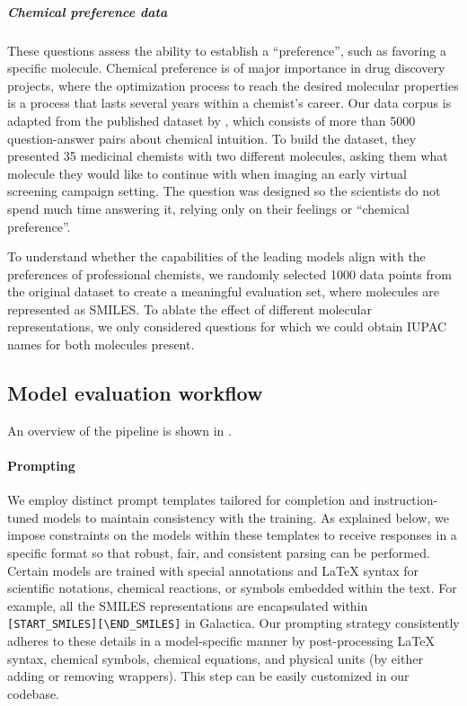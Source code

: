 \documentclass[11pt, oneside]{article}
\begin{document}
\begin{refsection}


\subparagraph{Chemical preference data}

These questions assess the ability to establish a \enquote{preference}, such as favoring a specific molecule. Chemical preference is of major importance in drug discovery projects, where the optimization process to reach the desired molecular properties is a process that lasts several years within a chemist's career.
Our data corpus is adapted from the published dataset by \textcite{Choung_2023}, which consists of more than 5000 question-answer pairs about chemical intuition. To build the dataset, they presented 35 medicinal chemists with two different molecules, asking them what molecule they would like to continue with when imaging an early virtual screening campaign setting. The question was designed so the scientists do not spend much time answering it, relying only on their feelings or \enquote{chemical preference}.

To understand whether the capabilities of the leading models align with the preferences of professional chemists, we randomly selected 1000 data points from the original dataset to create a meaningful evaluation set, where molecules are represented as SMILES.
To ablate the effect of different molecular representations, we only considered questions for which we could obtain IUPAC names for both molecules present.


\subsection{Model evaluation workflow}
An overview of the pipeline is shown in .

\paragraph{Prompting}

We employ distinct prompt templates tailored for completion and instruction-tuned models to maintain consistency with the training.
As explained below, we impose constraints on the models within these templates to receive responses in a specific format so that robust, fair, and consistent parsing can be performed.
Certain models are trained with special annotations and \LaTeX\xspace syntax for scientific notations, chemical reactions, or symbols embedded within the text.
For example, all the SMILES representations are encapsulated within \texttt{[START\_SMILES][\textbackslash END\_SMILES]} in Galactica\autocite{taylor2022galactica}.
Our prompting strategy consistently adheres to these details in a model-specific manner by post-processing \LaTeX\xspace syntax, chemical symbols, chemical equations, and physical units (by either adding or removing wrappers).
This step can be easily customized in our codebase.




\end{refsection}
\end{document}
